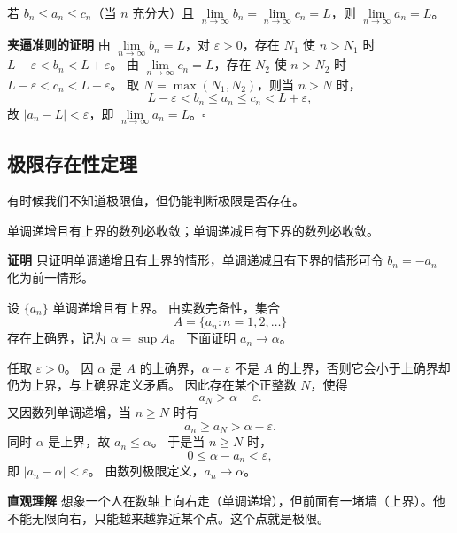 \documentclass[fontset=fandol]{ctexart}
\newenvironment{custom}[1]{\par\noindent\textbf{#1}\quad}{\par\vspace{0.8em}}
\newenvironment{intuition}{\par\noindent\textbf{直观理解}\quad}{\par\vspace{0.8em}}
\begin{document}
\begin{proposition}[夹逼准则]
	若 \(b_n \leq a_n \leq c_n\)（当 \(n\) 充分大）且 \(\lim\limits_{n \to \infty} b_n = \lim\limits_{n \to \infty} c_n = L\)，则 \(\lim\limits_{n \to \infty} a_n = L\)。
\end{proposition}
\begin{custom}{夹逼准则的证明}
	由 \(\lim \limits_{n \to \infty} b_n = L\)，对 \(\varepsilon > 0\)，存在 \(N_1\) 使 \(n > N_1\) 时 \(L - \varepsilon < b_n < L + \varepsilon\)。
	由 \(\lim\limits_{n \to \infty} c_n = L\)，存在 \(N_2\) 使 \(n > N_2\) 时 \(L - \varepsilon < c_n < L + \varepsilon\)。
	取 \(N = \max(N_1, N_2)\)，则当 \(n > N\) 时，
	\[
	L - \varepsilon < b_n \leq a_n \leq c_n < L + \varepsilon,
	\]
	故 \(|a_n - L| < \varepsilon\)，即 \(\lim \limits_{n \to \infty}a_n = L\)。\(\square\)
\end{custom}









\subsection{极限存在性定理}

有时候我们不知道极限值，但仍能判断极限是否存在。

\begin{theorem}[单调有界准则]
单调递增且有上界的数列必收敛；单调递减且有下界的数列必收敛。
\end{theorem}

\begin{custom}{证明}
只证明单调递增且有上界的情形，单调递减且有下界的情形可令 $b_n=-a_n$ 化为前一情形。

设 $\{a_n\}$ 单调递增且有上界。 由实数完备性，集合
\[
A=\{a_n:n=1,2,\ldots\}
\]
存在上确界，记为 $\alpha=\sup A$。 下面证明 $a_n\to\alpha$。

任取 $\varepsilon>0$。 因 $\alpha$ 是 $A$ 的上确界，$\alpha-\varepsilon$ 不是 $A$ 的上界，否则它会小于上确界却仍为上界，与上确界定义矛盾。 因此存在某个正整数 $N$，使得
\[
a_N>\alpha-\varepsilon.
\]
又因数列单调递增，当 $n\ge N$ 时有
\[
a_n\ge a_N>\alpha-\varepsilon.
\]
同时 $\alpha$ 是上界，故 $a_n\le \alpha$。 于是当 $n\ge N$ 时，
\[
0\le \alpha-a_n<\varepsilon,
\]
即 $|a_n-\alpha|<\varepsilon$。 由数列极限定义，$a_n\to\alpha$。
\end{custom}

\begin{intuition}
想象一个人在数轴上向右走（单调递增），但前面有一堵墙（上界）。他不能无限向右，只能越来越靠近某个点。这个点就是极限。
\end{intuition}
\end{document}
